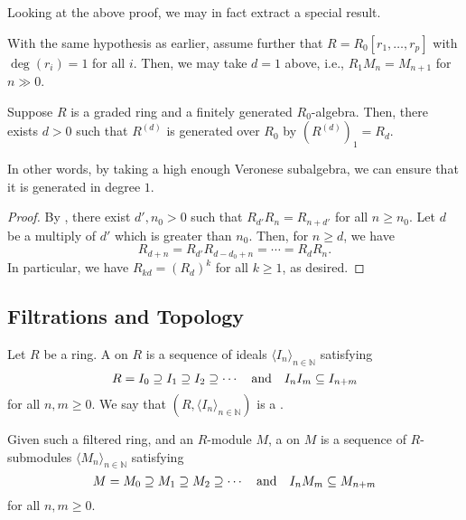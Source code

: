 \documentclass[12pt]{article}
\begin{document}
Looking at the above proof, we may in fact extract a special result.

\begin{por} \label{por:n-d-stabilise}
	With the same hypothesis as earlier, assume further that $R = R_{0}[r_{1}, \ldots, r_{p}]$ with $\deg(r_{i}) = 1$ for all $i$. \newline
	Then, we may take $d = 1$ above, i.e., $R_{1} M_{n} = M_{n + 1}$ for $n \gg 0$.
\end{por}

\begin{cor}
	Suppose $R$ is a graded ring and a finitely generated $R_{0}$-algebra. Then, there exists $d > 0$ such that $R^{(d)}$ is generated over $R_{0}$ by $(R^{(d)})_{1} = R_{d}$.
\end{cor}
In other words, by taking a high enough Veronese subalgebra, we can ensure that it is generated in degree $1$.
\begin{proof} 
	By , there exist $d', n_{0} > 0$ such that $R_{d'} R_{n} = R_{n + d'}$ for all $n \ge n_{0}$. \newline
	Let $d$ be a multiply of $d'$ which is greater than $n_{0}$. Then, for $n \ge d$, we have
	\begin{equation*} 
		R_{d + n} = R_{d'} R_{d - d_{0} + n} = \cdots = R_{d} R_{n}.
	\end{equation*}
	In particular, we have $R_{kd} = (R_{d})^{k}$ for all $k \ge 1$, as desired.
\end{proof}

\subsection{Filtrations and Topology}

\begin{defn}
	Let $R$ be a ring. A  on $R$ is a sequence of ideals $\langle I_{n} \rangle_{n \in \mathbb{N}}$ satisfying
	\begin{equation*} 
		R = I_{0} \supseteq I_{1} \supseteq I_{2} \supseteq \cdots \quad\text{and}\quad I_{n} I_{m} \subseteq I_{n + m}
	\end{equation*}
	for all $n, m \ge 0$. \newline
	We say that $(R, \langle I_{n} \rangle_{n \in \mathbb{N}})$ is a .

	Given such a filtered ring, and an $R$-module $M$, a  on $M$ is a sequence of $R$-submodules $\langle M_{n} \rangle_{n \in \mathbb{N}}$ satisfying
	\begin{equation*} 
		M = M_{0} \supseteq M_{1} \supseteq M_{2} \supseteq \cdots \quad\text{and}\quad I_{n} M_{m} \subseteq M_{n + m}
	\end{equation*}
	for all $n, m \ge 0$.
\end{defn}
\end{document}
